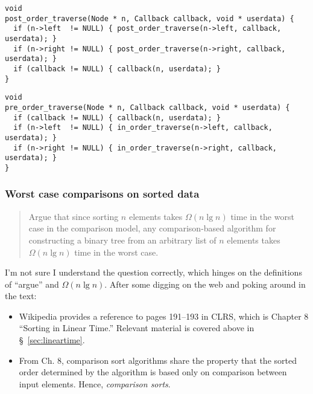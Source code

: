 \documentclass{article}
\begin{document}
\begin{lstlisting}[frame=single,title=Post-order traverse]
void
post_order_traverse(Node * n, Callback callback, void * userdata) {
  if (n->left  != NULL) { post_order_traverse(n->left, callback, userdata); }
  if (n->right != NULL) { post_order_traverse(n->right, callback, userdata); }
  if (callback != NULL) { callback(n, userdata); }
}
\end{lstlisting}

\begin{lstlisting}[frame=single,title=Pre-order traverse]
void
pre_order_traverse(Node * n, Callback callback, void * userdata) {
  if (callback != NULL) { callback(n, userdata); }
  if (n->left  != NULL) { in_order_traverse(n->left, callback, userdata); }
  if (n->right != NULL) { in_order_traverse(n->right, callback, userdata); }
}
\end{lstlisting}


\subsubsection{Worst case comparisons on sorted data}

\begin{quote}
  Argue that since sorting $n$ elements takes $\Omega(n\lg n)$ time in the worst
  case in the comparison model, any comparison-based algorithm for
  constructing a binary tree from an arbitrary list of $n$ elements takes
  $\Omega(n\lg n)$ time in the worst case.
\end{quote}

I'm not sure I understand the question correctly, which hinges on the
definitions of ``argue'' and $\Omega(n\lg n)$. After some digging on the
web and poking around in the text:

\begin{itemize}

  \item Wikipedia provides a reference to pages 191--193 in CLRS, which is Chapter 8
``Sorting in Linear Time.'' Relevant material is covered above in
\S~\ref{sec:lineartime}.

\item From Ch. 8, comparison sort algorithms share the property that
  the sorted order determined by the algorithm is based only on
  comparison between input elements. Hence, \emph{comparison sorts}.

\end{itemize}
\end{document}
